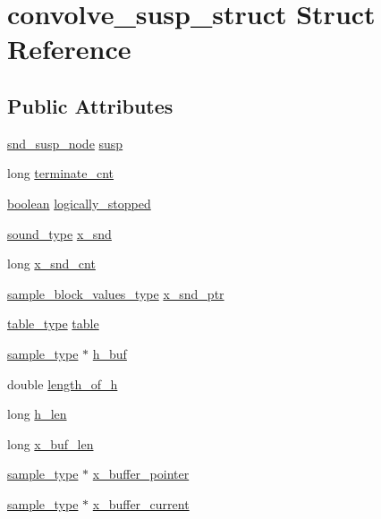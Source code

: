 \hypertarget{structconvolve__susp__struct}{}\section{convolve\+\_\+susp\+\_\+struct Struct Reference}
\label{structconvolve__susp__struct}
\subsection*{Public Attributes}
\begin{DoxyCompactItemize}
\item 
\hyperlink{sound_8h_a6b268203688a934bd798ceb55f85d4c0}{snd\+\_\+susp\+\_\+node} \hyperlink{structconvolve__susp__struct_ad069eba09ee037919e50a17a2786e4e5}{susp}
\item 
long \hyperlink{structconvolve__susp__struct_aae70c47632ff84e16d8cb6c2305efcf1}{terminate\+\_\+cnt}
\item 
\hyperlink{cext_8h_a7670a4e8a07d9ebb00411948b0bbf86d}{boolean} \hyperlink{structconvolve__susp__struct_a3181f6fe8e2f0b1c7195e6ef27d00981}{logically\+\_\+stopped}
\item 
\hyperlink{sound_8h_a792cec4ed9d6d636d342d9365ba265ea}{sound\+\_\+type} \hyperlink{structconvolve__susp__struct_a8970402564ecc828d57cb792197a1548}{x\+\_\+snd}
\item 
long \hyperlink{structconvolve__susp__struct_a80900e90aed5dac71c0f00afef272556}{x\+\_\+snd\+\_\+cnt}
\item 
\hyperlink{sound_8h_a83d17f7b465d1591f27cd28fc5eb8a03}{sample\+\_\+block\+\_\+values\+\_\+type} \hyperlink{structconvolve__susp__struct_aee4a9c8f32c4adef7cd2ff8b72e8f1d7}{x\+\_\+snd\+\_\+ptr}
\item 
\hyperlink{sound_8h_a187b856587310160cfd8b383e7377171}{table\+\_\+type} \hyperlink{structconvolve__susp__struct_a2a448a41f7aed958bdce396c38ebef54}{table}
\item 
\hyperlink{sound_8h_a3a9d1d4a1c153390d2401a6e9f71b32c}{sample\+\_\+type} $\ast$ \hyperlink{structconvolve__susp__struct_a71aff39b00b05e40d31b0b8865d87c1a}{h\+\_\+buf}
\item 
double \hyperlink{structconvolve__susp__struct_a2b6c79d0302b37f2f5b19e9d5871e2cc}{length\+\_\+of\+\_\+h}
\item 
long \hyperlink{structconvolve__susp__struct_a2d6f6f6a5ab95148e90a4f6a290218cf}{h\+\_\+len}
\item 
long \hyperlink{structconvolve__susp__struct_abbdaff617b17f9cb5957248bb2394853}{x\+\_\+buf\+\_\+len}
\item 
\hyperlink{sound_8h_a3a9d1d4a1c153390d2401a6e9f71b32c}{sample\+\_\+type} $\ast$ \hyperlink{structconvolve__susp__struct_a82ff1520d5da80c7c3cd89d802803f08}{x\+\_\+buffer\+\_\+pointer}
\item 
\hyperlink{sound_8h_a3a9d1d4a1c153390d2401a6e9f71b32c}{sample\+\_\+type} $\ast$ \hyperlink{structconvolve__susp__struct_adf6ccb598225421de7376c422fd66f2a}{x\+\_\+buffer\+\_\+current}
\end{DoxyCompactItemize}


